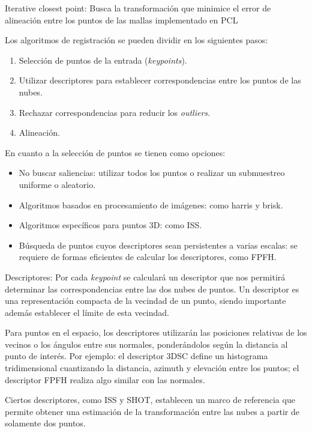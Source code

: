 \documentclass{pfc}
\begin{document}
		Iterative closest point:
			Busca la transformación que minimice el error de alineación
			entre los puntos de las mallas
			implementado en PCL


		Los algoritmos de registración se pueden dividir en los siguientes pasos:
		\begin{enumerate}
			\item Selección de puntos de la entrada (\emph{keypoints}).
			\item Utilizar descriptores para establecer correspondencias entre los puntos de las nubes.
			\item Rechazar correspondencias para reducir los \emph{outliers}.
			\item Alineación.
		\end{enumerate}

		En cuanto a la selección de puntos se tienen como opciones:
		\begin{itemize}
			\item No buscar saliencias: utilizar todos los puntos o realizar un submuestreo uniforme o aleatorio.
			\item Algoritmos basados en procesamiento de imágenes: como harris y brisk.
			\item Algoritmos específicos para puntos 3D: como ISS.
			\item Búsqueda de puntos cuyos descriptores sean persistentes a varias escalas: se requiere de formas eficientes de calcular los descriptores, como FPFH.
		\end{itemize}

		Descriptores:
			Por cada \emph{keypoint} se calculará un descriptor que nos
			permitirá determinar las correspondencias entre las dos nubes de
			puntos.
			Un descriptor es una representación compacta
			de la vecindad de un punto,
			siendo importante además establecer el límite de esta vecindad.

			Para puntos en el espacio, los descriptores utilizarán las
			posiciones relativas de los vecinos o los ángulos entre sus
			normales, ponderándolos según la distancia al punto de interés.
			Por ejemplo: el descriptor 3DSC define un histograma tridimensional
			cuantizando la distancia, azimuth y elevación entre los puntos;
			el descriptor FPFH realiza algo similar con las normales.

			Ciertos descriptores, como ISS y SHOT, establecen un marco de
			referencia que permite obtener una estimación de la transformación
			entre las nubes a partir de solamente dos puntos.
\end{document}
